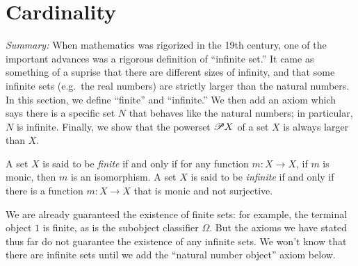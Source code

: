 \section{Cardinality}


{\it Summary:} When mathematics was rigorized in the 19th century, one
of the important advances was a rigorous definition of ``infinite
set.''  It came as something of a suprise that there are different
sizes of infinity, and that some infinite sets (e.g.\ the real
numbers) are strictly larger than the natural numbers.  In this
section, we define ``finite'' and ``infinite.''  We then add an axiom
which says there is a specific set $N$ that behaves like the natural
numbers; in particular, $N$ is infinite.  Finally, we show that the
powerset $\mathscr P X$ of a set $X$ is always larger than $X$.

\begin{defn} A set $X$ is said to be \emph{finite} if and only if for
  any function $m:X\to X$, if $m$ is monic, then $m$ is an
  isomorphism.  A set $X$ is said to be \emph{infinite} if and only if
  there is a function $m:X\to X$ that is monic and not
  surjective. \end{defn}

We are already guaranteed the existence of finite sets: for example,
the terminal object $1$ is finite, as is the subobject classifier
$\Omega$.  But the axioms we have stated thus far do not guarantee the
existence of any infinite sets.  We won't know that there are infinite
sets until we add the ``natural number object'' axiom below.




